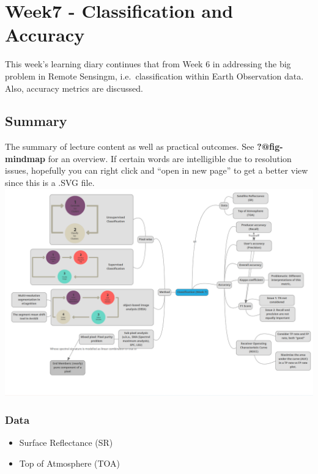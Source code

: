 \documentclass[
  letterpaper,
  DIV=11,
  numbers=noendperiod]{scrreprt}
\begin{document}

\hypertarget{week7---classification-and-accuracy}{%
\chapter{Week7 - Classification and
Accuracy}\label{week7---classification-and-accuracy}}

This week's learning diary continues that from Week 6 in addressing the
big problem in Remote Sensingm, i.e.~classification within Earth
Observation data. Also, accuracy metrics are discussed.

\hypertarget{summary-5}{%
\section{Summary}\label{summary-5}}

The summary of lecture content as well as practical outcomes. See
\textbf{?@fig-mindmap} for an overview. If certain words are
intelligible due to resolution issues, hopefully you can right click and
``open in new page'' to get a better view since this is a .SVG file.
\includegraphics{./images/MindMap.png}

\hypertarget{data}{%
\subsection{Data}\label{data}}

\begin{itemize}
\item
  Surface Reflectance (SR)
\item
  Top of Atmosphere (TOA)
\end{itemize}
\end{document}
